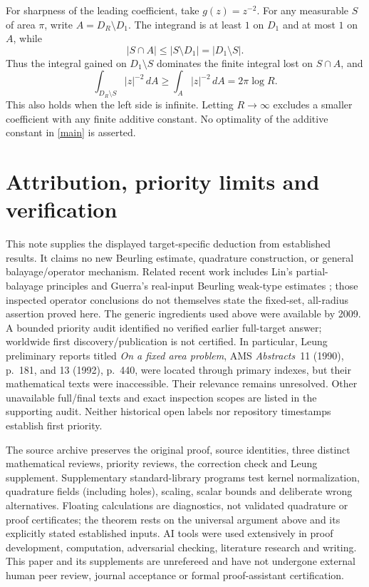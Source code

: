 \documentclass[11pt]{article}
\newcommand{\dd}{\,dA}
\begin{document}
For sharpness of the leading coefficient, take \(g(z)=z^{-2}\).
For any measurable \(S\) of area \(\pi\), write
\(A=D_R\setminus D_1\). The integrand is at least \(1\) on \(D_1\)
and at most \(1\) on \(A\), while
\[
 |S\cap A|\le |S\setminus D_1|
   =|D_1\setminus S|.
\]
Thus the integral gained on \(D_1\setminus S\) dominates the finite
integral lost on \(S\cap A\), and
\[
 \int_{D_R\setminus S}|z|^{-2}\dd
 \ge \int_A |z|^{-2}\dd=2\pi\log R.
\]
This also holds when the left side is infinite. Letting \(R\to\infty\)
excludes a smaller coefficient with any finite additive constant.
No optimality of the additive constant in \eqref{main} is asserted.

\section{Attribution, priority limits and verification}
This note supplies the displayed target-specific deduction from
established results. It claims no new Beurling estimate, quadrature
construction, or general balayage/operator mechanism.
Related recent work includes Lin's partial-balayage principles
\cite{Lin} and Guerra's real-input Beurling weak-type estimates
\cite{Guerra}; those inspected operator conclusions do not themselves
state the fixed-set, all-radius assertion proved here.
The generic ingredients used above were available by 2009.
A bounded priority audit identified no verified earlier full-target
answer; worldwide first discovery/publication is not certified.
In particular, Leung preliminary reports titled \emph{On a fixed
area problem}, AMS \emph{Abstracts}~11 (1990), p.~181, and
13 (1992), p.~440, were located through primary indexes, but their
mathematical texts were inaccessible. Their relevance remains
unresolved. Other unavailable full/final texts and exact inspection
scopes are listed in the supporting audit. Neither historical open
labels nor repository timestamps establish first priority.

The source archive preserves the original proof, source identities,
three distinct mathematical reviews, priority reviews, the correction
check and Leung supplement. Supplementary standard-library programs
test kernel normalization, quadrature fields (including holes),
scaling, scalar bounds and deliberate wrong alternatives.
Floating calculations are diagnostics, not validated quadrature or
proof certificates; the theorem rests on the universal argument above
and its explicitly stated established inputs.
AI tools were used extensively in proof development, computation,
adversarial checking, literature research and writing.
This paper and its supplements are unrefereed and have not undergone
external human peer review, journal acceptance or formal
proof-assistant certification.
\end{document}
